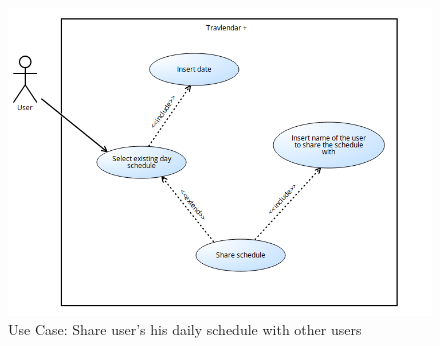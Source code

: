 \documentclass[numbers=noenddot, 12pt, a4paper, oneside]{scrbook}
\begin{document}
\begin{figure}[H]
	\includegraphics[width=1\textwidth]{usecases/Scenario6}
	\caption{Use Case: Share user's his daily schedule with other users}
\end{figure}
\end{document}
